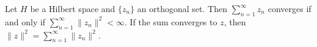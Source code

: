 Let $H$ be a Hilbert space and $\{z_n\}$ an orthogonal set. Then $\sum_{n=1}^{\infty} z_n$ converges if and only if $\sum_{n=1}^{\infty} \|z_n\|^2 < \infty$. If the sum converges to $z$, then $\|z\|^2 = \sum_{n=1}^{\infty} \|z_n\|^2$.
